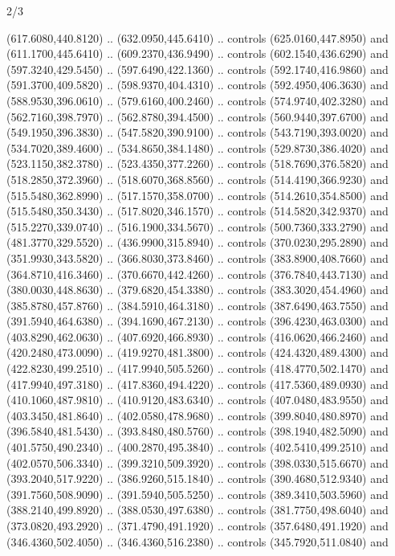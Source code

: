 \begin{flagdescription}{2/3}
\begin{scope}[xshift=0.5\flaglength,yshift=0.5\flagwidth,scale=\flagwidth/255]
\begin{scope}[y=-0.43pt, x=0.43pt,xshift=-193pt,yshift=133pt]
\begin{scope}[draw=black,line width=0.003\flagwidth]
\begin{scope}[fill=white]
  (617.6080,440.8120) .. (632.0950,445.6410) .. controls (625.0160,447.8950) and
  (611.1700,445.6410) .. (609.2370,436.9490) .. controls (602.1540,436.6290) and
  (597.3240,429.5450) .. (597.6490,422.1360) .. controls (592.1740,416.9860) and
  (591.3700,409.5820) .. (598.9370,404.4310) .. controls (592.4950,406.3630) and
  (588.9530,396.0610) .. (579.6160,400.2460) .. controls (574.9740,402.3280) and
  (562.7160,398.7970) .. (562.8780,394.4500) .. controls (560.9440,397.6700) and
  (549.1950,396.3830) .. (547.5820,390.9100) .. controls (543.7190,393.0020) and
  (534.7020,389.4600) .. (534.8650,384.1480) .. controls (529.8730,386.4020) and
  (523.1150,382.3780) .. (523.4350,377.2260) .. controls (518.7690,376.5820) and
  (518.2850,372.3960) .. (518.6070,368.8560) .. controls (514.4190,366.9230) and
  (515.5480,362.8990) .. (517.1570,358.0700) .. controls (514.2610,354.8500) and
  (515.5480,350.3430) .. (517.8020,346.1570) .. controls (514.5820,342.9370) and
  (515.2270,339.0740) .. (516.1900,334.5670) .. controls (500.7360,333.2790) and
  (481.3770,329.5520) .. (436.9900,315.8940) .. controls (370.0230,295.2890) and
  (351.9930,343.5820) .. (366.8030,373.8460) .. controls (383.8900,408.7660) and
  (364.8710,416.3460) .. (370.6670,442.4260) .. controls (376.7840,443.7130) and
  (380.0030,448.8630) .. (379.6820,454.3380) .. controls (383.3020,454.4960) and
  (385.8780,457.8760) .. (384.5910,464.3180) .. controls (387.6490,463.7550) and
  (391.5940,464.6380) .. (394.1690,467.2130) .. controls (396.4230,463.0300) and
  (403.8290,462.0630) .. (407.6920,466.8930) .. controls (416.0620,466.2460) and
  (420.2480,473.0090) .. (419.9270,481.3800) .. controls (424.4320,489.4300) and
  (422.8230,499.2510) .. (417.9940,505.5260) .. controls (418.4770,502.1470) and
  (417.9940,497.3180) .. (417.8360,494.4220) .. controls (417.5360,489.0930) and
  (410.1060,487.9810) .. (410.9120,483.6340) .. controls (407.0480,483.9550) and
  (403.3450,481.8640) .. (402.0580,478.9680) .. controls (399.8040,480.8970) and
  (396.5840,481.5430) .. (393.8480,480.5760) .. controls (398.1940,482.5090) and
  (401.5750,490.2340) .. (400.2870,495.3840) .. controls (402.5410,499.2510) and
  (402.0570,506.3340) .. (399.3210,509.3920) .. controls (398.0330,515.6670) and
  (393.2040,517.9220) .. (386.9260,515.1840) .. controls (390.4680,512.9340) and
  (391.7560,508.9090) .. (391.5940,505.5250) .. controls (389.3410,503.5960) and
  (388.2140,499.8920) .. (388.0530,497.6380) .. controls (381.7750,498.6040) and
  (373.0820,493.2920) .. (371.4790,491.1920) .. controls (357.6480,491.1920) and
  (346.4360,502.4050) .. (346.4360,516.2380) .. controls (345.7920,511.0840) and

\end{scope}
\end{scope}
\end{scope}
\end{scope}
\end{flagdescription}

